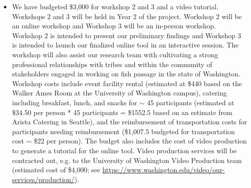 \begin{enumerate}
\begin{itemize}
\item We have budgeted \$3,000 for workshop 2 and 3 and a video tutorial. Workshops 2 and 3 will be held in Year 2 of the project. Workshop 2 will be an online workshop and Workshop 3 will be an in-person workshop. Workshop 2 is intended to present our preliminary findings and Workshop 3 is intended to launch our finalized online tool in an interactive session. The workshop will also assist our research team with cultivating a strong professional relationships with tribes and within the community of stakeholders engaged in working on fish passage in the state of Washington. Workshop costs include event facility rental (estimated at \$440 based on the Walker Ames Room at the University of Washington campus), catering including breakfast, lunch, and snacks for $\sim$ 45 participants (estimated at \$34.50 per person * 45 participants = \$1552.5 based on an estimate from Arista Catering in Seattle), and the reimbursement of transportation costs for participants needing reimbursement (\$1,007.5 budgeted for transportation cost $\sim$ \$22 per person). The budget also includes the cost of video production to generate a tutorial for the online tool. Video production services will be contracted out, e.g. to the University of Washington Video Production team (estimated cost of \$4,000; see \url{https://www.washington.edu/video/our-services/production/}).
\end{itemize}
\end{enumerate}